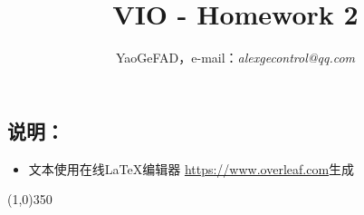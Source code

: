 \documentclass[a4paper]{article}
\begin{document}
\setlength{\leftskip}{20pt}
\title{VIO - Homework 2}
\author{YaoGeFAD，e-mail：{\it alexgecontrol@qq.com}}
\maketitle




\subsection*{说明：} %
\begin{itemize} 
\item 文本使用在线\LaTeX 编辑器 \url{https://www.overleaf.com}生成
\end{itemize}
\line(1,0){350}
\end{document}
